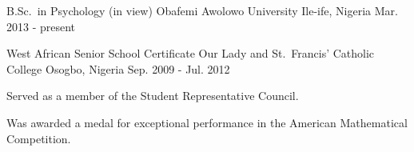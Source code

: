 

\begin{cventries}

  \cventry
    {B.Sc.\ in Psychology (in view)} %
    {Obafemi Awolowo University} %
    {Ile-ife, Nigeria} %
    {Mar. 2013 - present} %
    {}

  \cventry
    {West African Senior School Certificate} %
    {Our Lady and St.\ Francis' Catholic College} %
    {Osogbo, Nigeria} %
    {Sep. 2009 - Jul. 2012} %
    {
        \begin{cvitems}
            \item {Served as a member of the Student Representative Council.}
            \item {Was awarded a medal for exceptional performance in the American Mathematical Competition.}
        \end{cvitems}
    }

\end{cventries}
